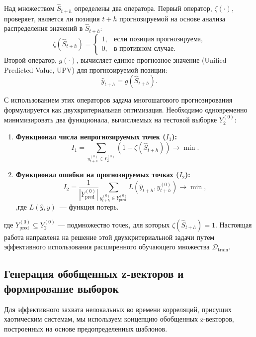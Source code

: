 \documentclass[a4paper,12pt]{extarticle}
\begin{document}
Над множеством $\hat{S}_{t+h}$ определены два оператора. Первый оператор,
 $\zeta(\cdot)$, проверяет, является ли позиция $t+h$ прогнозируемой на
 основе анализа распределения значений в $\hat{S}_{t+h}$:
\begin{equation}
\zeta(\hat{S}_{t+h}) =
\begin{cases}
1, & \text{если позиция прогнозируема,} \\
0, & \text{в противном случае.}
\end{cases}
\end{equation}
Второй оператор, $g(\cdot)$, вычисляет единое прогнозное значение
(Unified Predicted Value, UPV) для прогнозируемой позиции:
\begin{equation}
\hat{y}_{t+h} = g(\hat{S}_{t+h}).
\end{equation}

С использованием этих операторов задача многошагового прогнозирования
 формулируется как двухкритериальная оптимизация. Необходимо одновременно
 минимизировать два функционала, вычисляемых на тестовой выборке $Y_2^{(0)}$:
\begin{enumerate}
    \item \textbf{Функционал числа непрогнозируемых точек ($I_1$):}
    \begin{equation}
    I_1 = \sum_{y_{t+h}^{(0)} \in Y_2^{(0)}} \left( 1 - \zeta(\hat{S}_{t+h}) \right) \to \min.
    \end{equation}

\item \textbf{Функционал ошибки на прогнозируемых точках ($I_2$):}
    \begin{equation}
    I_2 = \frac{1}{|Y_{\text{pred}}^{(0)}|} \sum_{y_{t+h}^{(0)} \in Y_{\text{pred}}^{(0)}} L(\hat{y}_{t+h}, y_{t+h}^{(0)}) \to \min,
    \end{equation},где $L(\hat{y}, y)$~--- функция потерь.
\end{enumerate}
где $Y_{\text{pred}}^{(0)} \subseteq Y_2^{(0)}$ — подмножество точек, для
 которых $\zeta(\hat{S}_{t+h}) = 1$. Настоящая работа направлена на решение
  этой двухкритериальной задачи путем эффективного использования расширенного
   обучающего множества $\mathcal{D}_{\text{train}}$.
\subsection{Генерация обобщенных z-векторов и формирование выборок}

Для эффективного захвата нелокальных во времени корреляций, присущих хаотическим системам,
 мы используем концепцию обобщенных z-векторов, построенных на основе предопределенных шаблонов.
\end{document}
